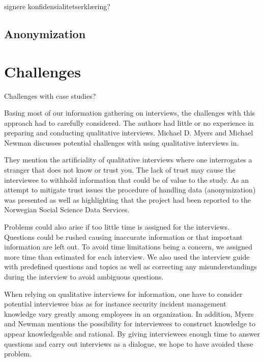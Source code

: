signere konfidensialitetserklæring?


\subsection{Anonymization}
\section{Challenges}
Challenges with case studies?

Basing most of our information gathering on interviews, the challenges with this approach had to carefully considered. The authors had little or no experience in preparing and conducting qualitative interviews. Michael D. Myers and Michael Newman discusses potential challenges with using qualitative interviews in\cite{myers2007qualitative}. 

They mention the artificiality of qualitative interviews where one interrogates a stranger that does not know or trust you. The lack of trust may cause the interviewee to withhold information that could be of value to the study. As an attempt to mitigate trust issues the procedure of handling data (anonymization) was presented as well as highlighting that the project had been reported to the Norwegian Social Science Data Services.   

Problems could also arise if too little time is assigned for the interviews. Questions could be rushed causing inaccurate information or that important information are left out. To avoid time limitations being a concern, we assigned more time than estimated for each interview. We also used the interview guide with predefined questions and topics as well as correcting any misunderstandings during the interview to avoid ambiguous questions.

When relying on qualitative interviews for information, one have to consider potential interviewee bias as for instance security incident management knowledge vary greatly among employees in an organization. In addition, Myers and Newman mentions the possibility for interviewees to construct knowledge to appear knowledgeable and rational. By giving interviewees enough time to answer questions and carry out interviews as a dialogue, we hope to have avoided these problem.


